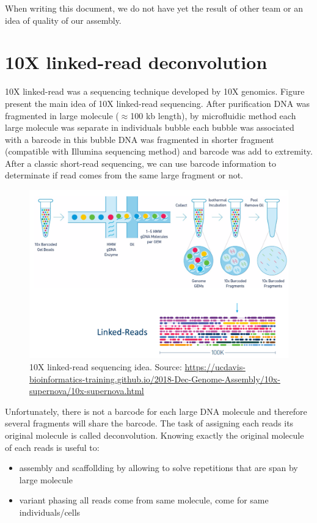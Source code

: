 \documentclass[main.tex]{subfiles}
\begin{document}
When writing this document, we do not have yet the result  of other team or an idea of quality of our assembly.

\section{10X linked-read deconvolution} \label{section:other_contribution:10x}

10X linked-read was a sequencing technique developed by 10X genomics. Figure \label{fig:other_contribution:10x} present the main idea of 10X linked-read sequencing. After purification DNA was fragmented in large molecule ($\approx$100 kb length), by microfluidic method each large molecule was separate in individuals bubble each bubble was associated with a barcode in this bubble DNA was fragmented in shorter fragment (compatible with Illumina sequencing method) and barcode was add to extremity. After a classic short-read sequencing, we can use barcode information to determinate if read comes from the same large fragment or not.

\begin{figure}
    \centering
    \includegraphics[width=\textwidth]{other_contribution/images/Linked_reads.png}
    \caption{10X linked-read sequencing idea. Source: \url{https://ucdavis-bioinformatics-training.github.io/2018-Dec-Genome-Assembly/10x-supernova/10x-supernova.html}}
    \label{fig:other_contribution:10x}
\end{figure}

Unfortunately, there is not a barcode for each large DNA molecule and therefore several fragments will share the barcode. The task of assigning each reads its original molecule is called deconvolution. Knowing exactly the original molecule of each reads is useful to: 
\begin{itemize}
    \item assembly and scaffollding by allowing to solve repetitions that are span by large molecule
    \item variant phasing all reads come from same molecule, come for same individuals/cells
\end{itemize}
 
\end{document}
